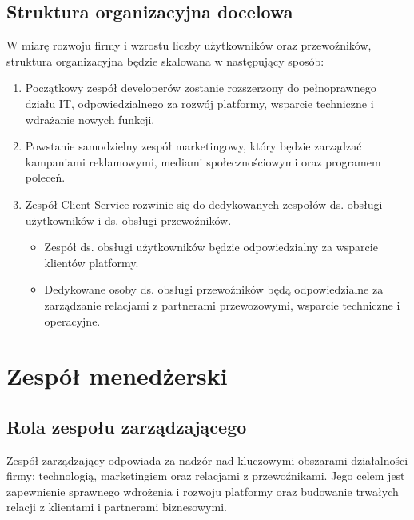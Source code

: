     \subsection {Struktura organizacyjna docelowa}
    W miarę rozwoju firmy i wzrostu liczby użytkowników oraz przewoźników, struktura organizacyjna będzie skalowana w następujący sposób:
    \begin{enumerate}
        \item Początkowy zespół developerów zostanie rozszerzony do pełnoprawnego działu IT, odpowiedzialnego za rozwój platformy, wsparcie techniczne i wdrażanie nowych funkcji.
        \item Powstanie samodzielny zespół marketingowy, który będzie zarządzać kampaniami reklamowymi, mediami społecznościowymi oraz programem poleceń.
        \item Zespół Client Service rozwinie się do dedykowanych zespołów ds. obsługi użytkowników i ds. obsługi przewoźników. 
        \begin{itemize}
            \item Zespół ds. obsługi użytkowników będzie odpowiedzialny za wsparcie klientów platformy.
            \item Dedykowane osoby ds. obsługi przewoźników będą odpowiedzialne za zarządzanie relacjami z partnerami przewozowymi, wsparcie techniczne i operacyjne.
            \end{itemize}
    \end{enumerate}
\section{Zespół menedżerski}


\subsection{Rola zespołu zarządzającego}
Zespół zarządzający odpowiada za nadzór nad kluczowymi obszarami działalności firmy: technologią, marketingiem oraz relacjami z przewoźnikami. Jego celem jest zapewnienie sprawnego wdrożenia i rozwoju platformy oraz budowanie trwałych relacji z klientami i partnerami biznesowymi.

